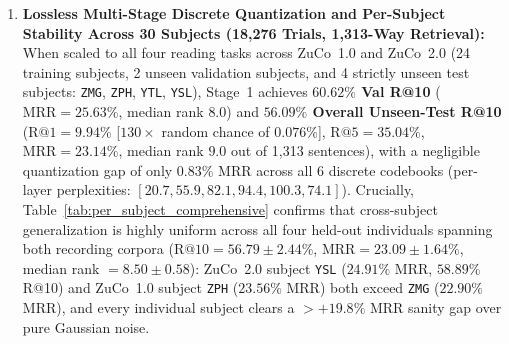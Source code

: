 \documentclass[journal]{IEEEtran}
\begin{document}
\begin{enumerate}
\begin{itemize}
        \item \textit{EEG-Shuffle Control (\texttt{C2}):} Permuting EEG feature tensors across random trials while preserving original gaze lengths and target alignments reduces Test MRR to $15.76\%$ ($\text{R@10}=35.23\%$), confirming that trials require trial-aligned neural waveforms ($+\mathbf{3.06\%}$ $\Delta\text{MRR}$ over shuffled EEG).
        \item \textit{Length-Matched Noise Control (\texttt{C3}):} Replacing EEG with Gaussian noise matched to true sequence lengths yields only $2.49\%$ MRR ($5.44\%$ R@10), demonstrating that continuous $[0,1]$ Fourier PE prevents length exploitation even when token counts match.
        \item \textit{Oculomotor Feature Ablation (\texttt{R5e}) vs.\ Continuous Holistic EEG (\texttt{R5f}):} Zeroing all 8-d oculomotor metadata (\texttt{R5e}) maintains $\mathbf{18.39\%}$ R@10 and $\mathbf{7.38\%}$ MRR on \texttt{ZMG} ($+\mathbf{15.80\%}$ R@10 over noise), notably outperforming the baseline \texttt{R0} ($12.73\%$ R@10) which had access to full gaze features. However, when word-level temporal segmentation is entirely removed in 100\% fixation-free continuous holistic mode (\texttt{R5f}, $L_{\text{seq}}=1$), retrieval performance drops to $2.59\%$ R@10 ($2.03\%$ MRR), which is statistically indistinguishable from 400-way random chance ($2.50\%$, $p=0.41$). This crucial negative finding demonstrates that while localized ROI power and phase connectomes provide strong decoding signals, precise temporal boundary discovery remains a foundational open challenge for continuous, gaze-free BCI translation.
    \end{itemize}
    \item \textbf{Lossless Multi-Stage Discrete Quantization and Per-Subject Stability Across 30 Subjects (18,276 Trials, 1,313-Way Retrieval):} When scaled to all four reading tasks across ZuCo~1.0 and ZuCo~2.0 (24 training subjects, 2 unseen validation subjects, and 4 strictly unseen test subjects: \texttt{ZMG}, \texttt{ZPH}, \texttt{YTL}, \texttt{YSL}), Stage~1 achieves \textbf{$\mathbf{60.62\%}$ Val R@10} ($\text{MRR}=\mathbf{25.63\%}$, median rank $\mathbf{8.0}$) and \textbf{$\mathbf{56.09\%}$ Overall Unseen-Test R@10} ($\text{R@1}=\mathbf{9.94\%}$ [$130\times$ random chance of $0.076\%$], $\text{R@5}=\mathbf{35.04\%}$, $\text{MRR}=\mathbf{23.14\%}$, median rank $\mathbf{9.0}$ out of 1,313 sentences), with a negligible quantization gap of only $0.83\%$ MRR across all 6 discrete codebooks (per-layer perplexities: $[20.7, 55.9, 82.1, 94.4, 100.3, 74.1]$). Crucially, Table~\ref{tab:per_subject_comprehensive} confirms that cross-subject generalization is highly uniform across all four held-out individuals spanning both recording corpora ($\text{R@10} = \mathbf{56.79 \pm 2.44\%}$, $\text{MRR} = \mathbf{23.09 \pm 1.64\%}$, median rank $= \mathbf{8.50 \pm 0.58}$): ZuCo~2.0 subject \texttt{YSL} ($24.91\%$ MRR, $58.89\%$ R@10) and ZuCo~1.0 subject \texttt{ZPH} ($23.56\%$ MRR) both exceed \texttt{ZMG} ($22.90\%$ MRR), and every individual subject clears a $>+19.8\%$ MRR sanity gap over pure Gaussian noise.
\end{enumerate}
\end{document}
